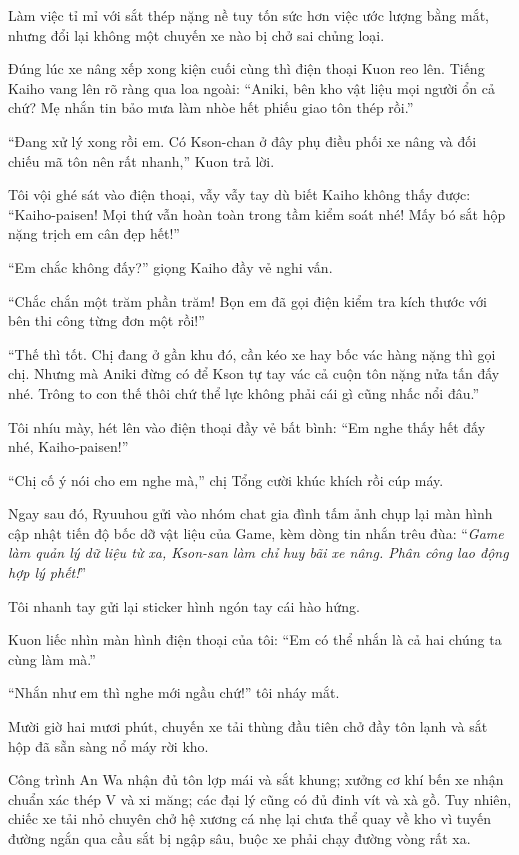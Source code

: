 ﻿\documentclass[../main.tex]{subfiles}
\begin{document}
Làm việc tỉ mỉ với sắt thép nặng nề tuy tốn sức hơn việc ước lượng bằng mắt, nhưng đổi lại không một chuyến xe nào bị chở sai chủng loại.

Đúng lúc xe nâng xếp xong kiện cuối cùng thì điện thoại Kuon reo lên. Tiếng Kaiho vang lên rõ ràng qua loa ngoài: ``Aniki, bên kho vật liệu mọi người ổn cả chứ? Mẹ nhắn tin bảo mưa làm nhòe hết phiếu giao tôn thép rồi.''

``Đang xử lý xong rồi em. Có Kson-chan ở đây phụ điều phối xe nâng và đối chiếu mã tôn nên rất nhanh,'' Kuon trả lời.

Tôi vội ghé sát vào điện thoại, vẫy vẫy tay dù biết Kaiho không thấy được: ``Kaiho-paisen! Mọi thứ vẫn hoàn toàn trong tầm kiểm soát nhé! Mấy bó sắt hộp nặng trịch em cân đẹp hết!''

``Em chắc không đấy?'' giọng Kaiho đầy vẻ nghi vấn.

``Chắc chắn một trăm phần trăm! Bọn em đã gọi điện kiểm tra kích thước với bên thi công từng đơn một rồi!''

``Thế thì tốt. Chị đang ở gần khu đó, cần kéo xe hay bốc vác hàng nặng thì gọi chị. Nhưng mà Aniki đừng có để Kson tự tay vác cả cuộn tôn nặng nửa tấn đấy nhé. Trông to con thế thôi chứ thể lực không phải cái gì cũng nhấc nổi đâu.''

Tôi nhíu mày, hét lên vào điện thoại đầy vẻ bất bình: ``Em nghe thấy hết đấy nhé, Kaiho-paisen!''

``Chị cố ý nói cho em nghe mà,'' chị Tổng cười khúc khích rồi cúp máy.

Ngay sau đó, Ryuuhou gửi vào nhóm chat gia đình tấm ảnh chụp lại màn hình cập nhật tiến độ bốc dỡ vật liệu của Game, kèm dòng tin nhắn trêu đùa: ``\textit{Game làm quản lý dữ liệu từ xa, Kson-san làm chỉ huy bãi xe nâng. Phân công lao động hợp lý phết!}''

Tôi nhanh tay gửi lại sticker hình ngón tay cái hào hứng.

Kuon liếc nhìn màn hình điện thoại của tôi: ``Em có thể nhắn là cả hai chúng ta cùng làm mà.''

``Nhắn như em thì nghe mới ngầu chứ!'' tôi nháy mắt.

\ct

Mười giờ hai mươi phút, chuyến xe tải thùng đầu tiên chở đầy tôn lạnh và sắt hộp đã sẵn sàng nổ máy rời kho.

Công trình An Wa nhận đủ tôn lợp mái và sắt khung; xưởng cơ khí bến xe nhận chuẩn xác thép V và xi măng; các đại lý cũng có đủ đinh vít và xà gồ. Tuy nhiên, chiếc xe tải nhỏ chuyên chở hệ xương cá nhẹ lại chưa thể quay về kho vì tuyến đường ngắn qua cầu sắt bị ngập sâu, buộc xe phải chạy đường vòng rất xa.
\end{document}
